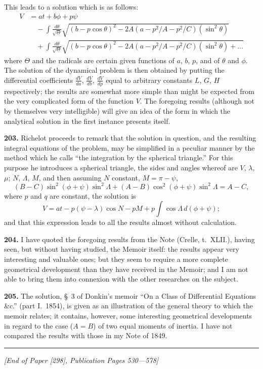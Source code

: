 \documentclass[11pt,a4paper]{article}
\theoremstyle{definition}
\begin{document}
This leads to a solution which is as follows:
\begin{align*}
V &= at + b\phi + p\psi \\
&\quad - \int\!\frac{d\theta}{\sqrt{\Theta}} \sqrt{(b - p\cos\theta)^2 - 2A(a - p^2/A - p^2/C)(\sin^2\theta)} \\
&\quad + \int\!\frac{d\theta}{\sqrt{\Theta}} \sqrt{(b - p\cos\theta)^2 - 2A(a - p^2/A - p^2/C)(\sin^2\theta) + \ldots}
\end{align*}
where $\Theta$ and the radicals are certain given functions of $a$, $b$, $p$, and of $\theta$ and $\phi$. The solution of the dynamical problem is then obtained by putting the differential coefficients $\frac{dV}{da}$, $\frac{dV}{db}$, $\frac{dV}{dp}$ equal to arbitrary constants $L$, $G$, $H$ respectively; the results are somewhat more simple than might be expected from the very complicated form of the function $V$. The foregoing results (although not by themselves very intelligible) will give an idea of the form in which the analytical solution in the first instance presents itself.

\textbf{203.} Richelot proceeds to remark that the solution in question, and the resulting integral equations of the problem, may be simplified in a peculiar manner by the method which he calls ``the integration by the spherical triangle.'' For this purpose he introduces a spherical triangle, the sides and angles whereof are $V$, $\lambda$, $\mu$; $N$, $\Lambda$, $M$, and then assuming $N$ constant, $M = \pi - \psi$,
\[
(B - C)\sin^2(\phi + \psi)\sin^2\Lambda + (A - B)\cos^2(\phi + \psi)\sin^2\Lambda = A - C,
\]
where $p$ and $q$ are constant, the solution is
\[
V = at - p(\psi - \lambda)\cos N - pM + p\int\!\cos\Lambda\,d(\phi + \psi);
\]
and that this expression leads to all the results almost without calculation.

\textbf{204.} I have quoted the foregoing results from the Note (Crelle, t.~XLII.), having seen, but without having studied, the Memoir itself: the results appear very interesting and valuable ones; but they seem to require a more complete geometrical development than they have received in the Memoir; and I am not able to bring them into connexion with the other researches on the subject.

\textbf{205.} The solution, \S~3 of Donkin's memoir ``On a Class of Differential Equations \&c.'' (part I.~1854), is given as an illustration of the general theory to which the memoir relates; it contains, however, some interesting geometrical developments in regard to the case ($A = B$) of two equal moments of inertia. I have not compared the results with those in my Note of 1849.

\vspace{1cm}
\noindent\rule{\textwidth}{0.5pt}
\vspace{0.5cm}

\noindent\textit{[End of Paper [298], Publication Pages 530---578]}
\end{document}
